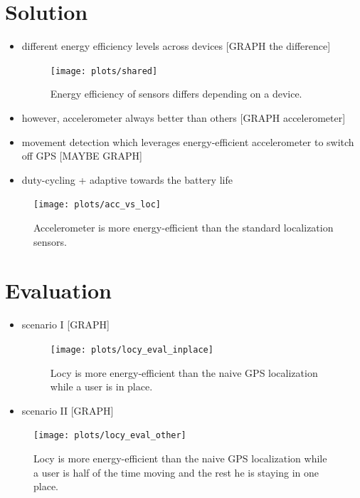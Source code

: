 \documentclass[a2,landscape]{a0poster}
\begin{document}
\section*{Solution}
\begin{itemize}
   \item different energy efficiency levels across devices [GRAPH the difference]
   
\begin{figure}[H]
\texttt{[image: plots/shared]}
\caption{\label{p:shared} \footnotesize{Energy efficiency of sensors differs depending on a device.} }
\end{figure}

   \item however, accelerometer always better than others [GRAPH accelerometer]
   \item movement detection which leverages energy-efficient accelerometer to switch off GPS [MAYBE GRAPH]
   \item duty-cycling + adaptive towards the battery life
  \end{itemize}

\begin{figure}[H]
\texttt{[image: plots/acc\_vs\_loc]}
\caption{\label{p:acc_vs_loc} \footnotesize{Accelerometer is more energy-efficient than the standard localization sensors.} }
\end{figure}


\mbox{}\framebreak
\section*{Evaluation}
\begin{itemize}
   \item scenario I [GRAPH]
\begin{figure}[H]
\texttt{[image: plots/locy\_eval\_inplace]}
\caption{\label{p:locy_eval_place} \footnotesize{Locy is more energy-efficient than the naive GPS localization while a user is in place.} }
\end{figure}
   \item scenario II [GRAPH]
  \end{itemize}
  



\begin{figure}[H]
\texttt{[image: plots/locy\_eval\_other]}
\caption{\label{p:locy_eval_other} \footnotesize{Locy is more energy-efficient than the naive GPS localization while a user is half of the time moving and the rest he is staying in one place.} }
\end{figure}
\end{document}
